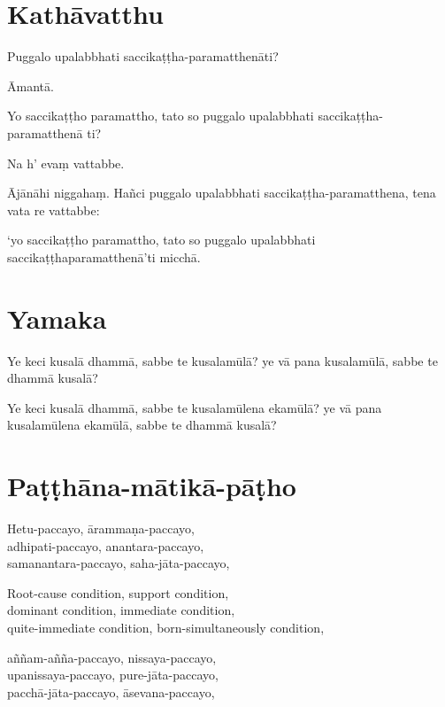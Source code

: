 
\section{Kathāvatthu}

Puggalo upalabbhati saccikaṭṭha-paramatthenāti?

Āmantā.

Yo saccikaṭṭho paramattho, tato so puggalo upalabbhati
saccikaṭṭha-paramatthenā ti?

Na h’ evaṃ vattabbe.

Ājānāhi niggahaṃ. Hañci puggalo upalabbhati
saccikaṭṭha-paramatthena, tena vata re vattabbe:

`yo saccikaṭṭho paramattho, tato so puggalo upalabbhati
saccikaṭṭhaparamatthenā'ti micchā.


\section{Yamaka}

Ye keci kusalā dhammā, sabbe te kusalamūlā? ye vā pana kusalamūlā, sabbe te
dhammā kusalā?

Ye keci kusalā dhammā, sabbe te kusalamūlena ekamūlā? ye vā pana kusalamūlena
ekamūlā, sabbe te dhammā kusalā?


\section{Paṭṭhāna-mātikā-pāṭho}



Hetu-paccayo, ārammaṇa-paccayo,\\
adhipati-paccayo, anantara-paccayo,\\
samanantara-paccayo, saha-jāta-paccayo,

\begin{english}
  Root-cause condition, support condition,\\
  dominant condition, immediate condition,\\
  quite-immediate condition, born-simultaneously condition,
\end{english}

aññam-añña-paccayo, nissaya-paccayo,\\
upanissaya-paccayo, pure-jāta-paccayo,\\
pacchā-jāta-paccayo, āsevana-paccayo,

